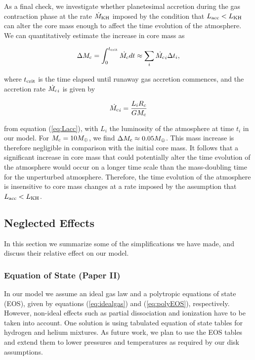 \documentclass[apj]{emulateapj}
\begin{document}
As a final check, we investigate whether planetesimal accretion during the gas contraction phase at the rate $\dot{M}_{\rm{KH}}$ imposed by the condition that $L_{\rm{acc}}<L_{\rm{KH}}$ can alter the core mass enough to affect the time evolution of the atmosphere. We can quantitatively estimate the increase in core mass as 

\begin{equation}
\label{eq:cminc}
\Delta M_{\rm{c}} = \int_0^{t_{\rm{crit}}} \dot{M_{\rm{c}}} dt \approx \sum_i \dot{M_{\rm{c}}}_i \Delta t_i,
\end{equation}
 
 \noindent where $t_{\rm{crit}}$ is the time elapsed until runaway gas accretion commences, and the accretion rate $ \dot{M_{\rm{c}}}_i $ is given by 
 
 \begin{equation}
 \label{eq:Mdotexp}
 \dot{M_{\rm{c}}}_i =\frac{L_i R_c}{G M_{\rm{c}}} 
 \end{equation}
 
 \noindent from equation (\ref{eq:Lacc}), with $L_i$ the luminosity of the atmosphere at time $t_i$ in our model. For $M_{\rm{c}}=10 M_{\oplus}$, we find $\Delta M_{\rm{c}} \approx 0.05 M_{\oplus}$. This mass increase is therefore negligible in comparison with the initial core mass. It follows that a significant increase in core mass that could potentially alter the time evolution of the atmosphere would occur on a longer time scale than the mass-doubling time for the unperturbed atmosphere. Therefore, the time evolution of the atmosphere is insensitive to core mass changes at a rate imposed by the assumption that $L_{\rm{acc}}<L_{\rm{KH}}$.
 
 \subsection{Neglected Effects}
 \label{neglected}
 
 In this section we summarize some of the simplifications we have made, and discuss their relative effect on our model.
 
 \subsubsection{Equation of State \textbf{(Paper II)}}
 \label{EOS}
 
 In our model we assume an ideal gas law and a polytropic equations of state (EOS), given by equations (\ref{eq:idealgas}) and (\ref{eq:polyEOS}), respectively. However, non-ideal effects such as partial dissociation and ionization have to be taken into account. One solution is using tabulated equation of state tables for hydrogen and helium mixtures. As future work, we plan to use the \citet{saumon95} EOS tables and extend them to lower pressures and temperatures as required by our disk assumptions.
 
\end{document}
